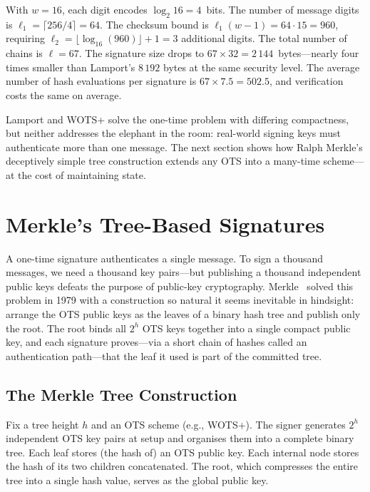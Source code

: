\begin{example}[WOTS+ Sizes with $w = 16$, $n = 256$]
\label{ex:wots-sizes}
With $w = 16$, each digit encodes $\log_2 16 = 4$~bits.  The number of message digits is $\ell_1 = \lceil 256/4 \rceil = 64$.  The checksum bound is $\ell_1(w-1) = 64 \cdot 15 = 960$, requiring $\ell_2 = \lfloor\log_{16}(960)\rfloor + 1 = 3$ additional digits.  The total number of chains is $\ell = 67$.  The signature size drops to $67 \times 32 = 2\,144$~bytes---nearly four times smaller than Lamport's $8\,192$ bytes at the same security level.  The average number of hash evaluations per signature is $67 \times 7.5 = 502.5$, and verification costs the same on average.
\end{example}

Lamport and WOTS+ solve the one-time problem with differing compactness, but neither addresses the elephant in the room: real-world signing keys must authenticate more than one message.  The next section shows how Ralph Merkle's deceptively simple tree construction extends any OTS into a many-time scheme---at the cost of maintaining state.


\section{Merkle's Tree-Based Signatures}
\label{sec:merkle}

A one-time signature authenticates a single message.  To sign a thousand messages, we need a thousand key pairs---but publishing a thousand independent public keys defeats the purpose of public-key cryptography.  Merkle~\cite{Merkle1979} solved this problem in 1979 with a construction so natural it seems inevitable in hindsight: arrange the OTS public keys as the leaves of a binary hash tree and publish only the root.  The root binds all $2^h$ OTS keys together into a single compact public key, and each signature proves---via a short chain of hashes called an authentication path---that the leaf it used is part of the committed tree.

\subsection{The Merkle Tree Construction}
\label{subsec:merkle-tree}

Fix a tree height $h$ and an OTS scheme (e.g., WOTS+).  The signer generates $2^h$ independent OTS key pairs at setup and organises them into a complete binary tree.  Each leaf stores (the hash of) an OTS public key.  Each internal node stores the hash of its two children concatenated.  The root, which compresses the entire tree into a single hash value, serves as the global public key.

